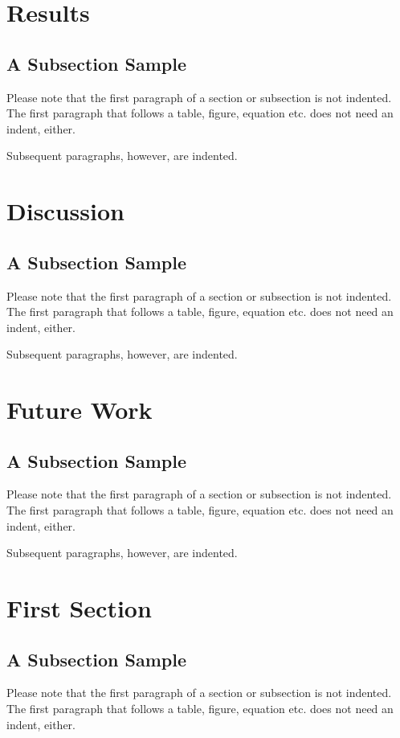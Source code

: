\documentclass[runningheads]{llncs}
\begin{document}
\section{Results}
\subsection{A Subsection Sample}
Please note that the first paragraph of a section or subsection is
not indented. The first paragraph that follows a table, figure,
equation etc. does not need an indent, either.

Subsequent paragraphs, however, are indented.

\section{Discussion}
\subsection{A Subsection Sample}
Please note that the first paragraph of a section or subsection is
not indented. The first paragraph that follows a table, figure,
equation etc. does not need an indent, either.

Subsequent paragraphs, however, are indented.

\section{Future Work}
\subsection{A Subsection Sample}
Please note that the first paragraph of a section or subsection is
not indented. The first paragraph that follows a table, figure,
equation etc. does not need an indent, either.

Subsequent paragraphs, however, are indented.

\section{First Section}
\subsection{A Subsection Sample}
Please note that the first paragraph of a section or subsection is
not indented. The first paragraph that follows a table, figure,
equation etc. does not need an indent, either.
\end{document}
